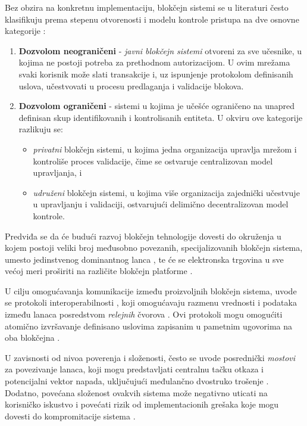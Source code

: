 Bez obzira na konkretnu implementaciju, blokčejn sistemi se u literaturi često klasifikuju prema stepenu otvorenosti i modelu kontrole pristupa na dve osnovne kategorije \cite{solat2021permissioned}:
\begin{enumerate}
\item \textbf{Dozvolom neograničeni}  - \textit{javni blokčejn sistemi} otvoreni za sve učesnike, u kojima ne postoji potreba za prethodnom autorizacijom. U ovim mrežama svaki korisnik može slati transakcije i, uz ispunjenje protokolom definisanih uslova, učestvovati u procesu predlaganja i validacije blokova.

\item \textbf{Dozvolom ograničeni}  - sistemi u kojima je učešće ograničeno na unapred definisan skup identifikovanih i kontrolisanih entiteta. U okviru ove kategorije razlikuju se:
\begin{itemize}
\item \textit{privatni}  blokčejn sistemi, u kojima jedna organizacija upravlja mrežom i kontroliše proces validacije, čime se ostvaruje centralizovan model upravljanja, i
\item \textit{udruženi}  blokčejn sistemi, u kojima više organizacija zajednički učestvuje u upravljanju i validaciji, ostvarujući delimično decentralizovan model kontrole.
\end{itemize}
\end{enumerate}

Predviđa se da će budući razvoj blokčejn tehnologije dovesti do okruženja u kojem postoji veliki broj međusobno povezanih, specijalizovanih blokčejn sistema, umesto jedinstvenog dominantnog lanca \cite{vo2018internet}, te će se elektronska trgovina u sve većoj meri proširiti na različite blokčejn platforme \cite{herlihy2019cross}.

U cilju omogućavanja komunikacije između proizvoljnih blokčejn sistema, uvode se protokoli interoperabilnosti  \cite{belchior2021survey}, koji omogućavaju razmenu vrednosti i podataka između lanaca posredstvom \textit{relejnih} čvorova . Ovi protokoli mogu omogućiti atomično izvršavanje definisano uslovima zapisanim u pametnim ugovorima na oba blokčejna \cite{tsabary2021mad}. 

U zavisnosti od nivoa poverenja i složenosti, često se uvode posrednički \textit{mostovi}  za povezivanje lanaca, koji mogu predstavljati centralnu tačku otkaza i potencijalni vektor napada, uključujući međulančno dvostruko trošenje \cite{mukherjee2025double}. Dodatno, povećana složenost ovakvih sistema može negativno uticati na korisničko iskustvo i povećati rizik od implementacionih grešaka koje mogu dovesti do kompromitacije sistema \cite{zhang2024security}.

